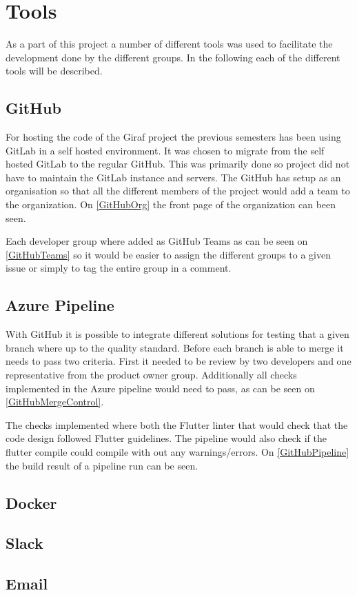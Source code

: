 \section{Tools}
As a part of this project a number of different tools was used to facilitate the development done by the different groups.
In the following each of the different tools will be described. 

\subsection{GitHub}
For hosting the code of the Giraf project the previous semesters has been using GitLab in a self hosted environment. 
It was chosen to migrate from the self hosted GitLab to the regular GitHub.
This was primarily done so project did not have to maintain the GitLab instance and servers.
The GitHub has setup as an organisation so that all the different members of the project would add a team to the organization. On \autoref{GitHubOrg} the front page of the organization can been seen. 


Each developer group where added as GitHub Teams as can be seen on \autoref{GitHubTeams} so it would be easier to assign the different groups to a given issue or simply to tag the entire group in a comment. 


\subsection{Azure Pipeline}
With GitHub it is possible to integrate different solutions for testing that a given branch where up to the quality standard. 
Before each branch is able to merge it needs to pass two criteria. 
First it needed to be review by two developers and one representative from the product owner group. 
Additionally all checks implemented in the Azure pipeline would need to pass, as can be seen on \autoref{GitHubMergeControl}. 


The checks implemented where both the Flutter linter that would check that the code design followed Flutter guidelines. 
The pipeline would also check if the flutter compile could compile with out any warnings/errors. 
On \autoref{GitHubPipeline} the build result of a pipeline run can be seen.



\subsection{Docker}

\subsection{Slack}

\subsection{Email}
